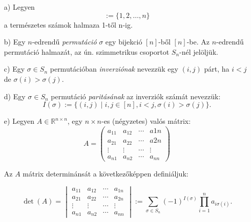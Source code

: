 \documentclass{article}
\theoremstyle{definition} %
\begin{document}
\begin{enumerate}
	\item[a)] Legyen
	\begin{equation}
		[n] := \{1, 2, \ldots, n\}
	\end{equation}
	a természetes számok halmaza 1-től n-ig.
	
	\item[b)] Egy $n$-edrendű \emph{permutáció} $\sigma$ egy bijekció $[n]$-ből $[n]$-be. Az $n$-edrendű permutáció halmazát, az ún. szimmetrikus csoportot $S_n$-nél jelöljük.
	
	\item[c)] Egy $\sigma \in S_n$ permutációban \emph{inverziónak} nevezzük egy $(i,j)$ párt, ha $i < j$ de $\sigma(i) > \sigma(j)$.
	
	\item[d)] Egy $\sigma \in S_n$ permutáció \emph{paritásának} az inverziók számát nevezzük:
	\begin{equation}
		I(\sigma) := \{(i, j) \mid i, j \in [n], i < j, \sigma(i) > \sigma(j)\}.
	\end{equation}
	
	\item[e)] Legyen $A \in \mathbb{R}^{n \times n}$, egy $n \times n$-es (négyzetes) valós mátrix:
	\begin{equation}
		A = \begin{pmatrix}
			a_{11} & a_{12} & \cdots & a{1n} \\
			a_{21} & a_{22} & \cdots & a{2n} \\
			\vdots & \vdots & \cdots & \vdots \\
			a_{n1} & a_{n2} & \cdots & a_{nn}
		\end{pmatrix}
	\end{equation}
	
	Az $A$ mátrix determinánsát a következőképpen definiáljuk:
	
	\begin{equation}
		\det(A) = \begin{vmatrix}
			a_{11} & a_{12} & \cdots & a_{1n} \\
			a_{21} & a_{22} & \cdots & a_{2n} \\
			\vdots & \vdots & \cdots & \vdots \\
			a_{n1} & a_{n2} & \cdots & a_{nn}
		\end{vmatrix} := \sum_{\sigma \in S_n} (-1)^{I(\sigma)} \prod_{i=1}^{n} a_{i\sigma(i)}.
	\end{equation}
\end{enumerate}
\end{document}
